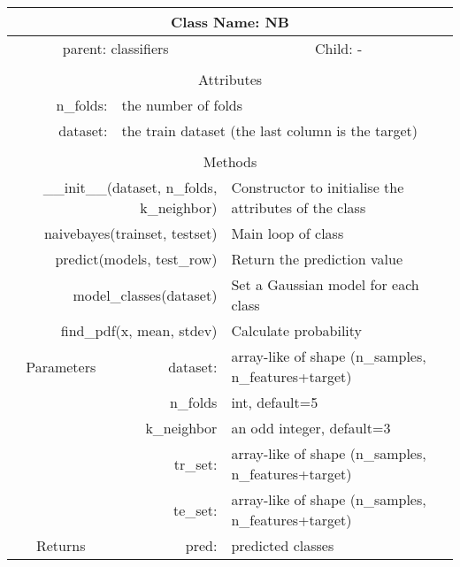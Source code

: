 {\small
\begin{tabular}{llll}
\toprule
\multicolumn{4}{|c|}{Class Name: NB} \\
\midrule
\multicolumn{2}{|c|}{parent: classifiers} &\multicolumn{2}{|c|}{Child: -} \\\bottomrule


\multicolumn{4}{c}{} \\\bottomrule
\multicolumn{4}{|c|}{Attributes} \\\midrule
\multicolumn{1}{|r}{n\_folds: } & \multicolumn{3}{l|}{the number of folds } \\
\multicolumn{1}{|r}{dataset: } & \multicolumn{3}{l|}{the train dataset (the last column is the target) } \\\bottomrule


\multicolumn{4}{c}{} \\\bottomrule
\multicolumn{4}{|c|}{Methods} \\\midrule
\multicolumn{2}{|r}{\_\_init\_\_(dataset, n\_folds, k\_neighbor) } & \multicolumn{2}{l|}{Constructor to initialise the attributes of the class} \\
\multicolumn{2}{|r}{naivebayes(trainset, testset) } & \multicolumn{2}{l|}{Main loop of class} \\
\multicolumn{2}{|r}{predict(models, test\_row) } & \multicolumn{2}{l|}{Return the prediction value} \\
\multicolumn{2}{|r}{model\_classes(dataset) } & \multicolumn{2}{l|}{Set a Gaussian model for each class} \\
\multicolumn{2}{|r}{find\_pdf(x, mean, stdev) } & \multicolumn{2}{l|}{Calculate probability} \\ \midrule


\multicolumn{1}{|c|}{Parameters}
& \multicolumn{1}{|r}{dataset:}& \multicolumn{2}{l|}{array-like of shape (n\_samples, n\_features+target)}\\
\multicolumn{1}{|l|}{} & \multicolumn{1}{|r}{n\_folds}& \multicolumn{2}{l|}{int, default=5}\\
\multicolumn{1}{|l|}{} & \multicolumn{1}{|r}{k\_neighbor}& \multicolumn{2}{l|}{an odd integer, default=3}\\
\multicolumn{1}{|l|}{}& \multicolumn{1}{|r}{tr\_set:}& \multicolumn{2}{l|}{array-like of shape (n\_samples, n\_features+target)}\\
\multicolumn{1}{|l|}{}& \multicolumn{1}{|r}{te\_set:}& \multicolumn{2}{l|}{array-like of shape (n\_samples, n\_features+target)}\\\midrule

\multicolumn{1}{|c|}{Returns} & \multicolumn{1}{|r}{pred:}& \multicolumn{2}{l|}{predicted classes}\\




\bottomrule
\end{tabular}}